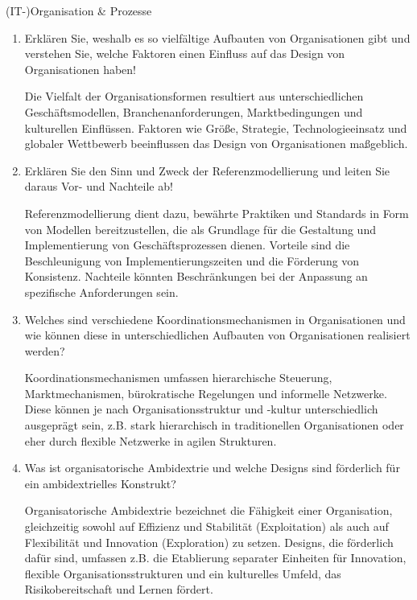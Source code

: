 \documentclass{article}
\begin{document}
\begin{exercise}{(IT-)Organisation \& Prozesse}
\begin{enumerate}
    \item Erklären Sie, weshalb es so vielfältige Aufbauten von Organisationen gibt und verstehen Sie, welche Faktoren einen Einfluss auf das Design von Organisationen haben!
          \begin{solution}
            Die Vielfalt der Organisationsformen resultiert aus unterschiedlichen Geschäftsmodellen, Branchenanforderungen, Marktbedingungen und kulturellen Einflüssen. Faktoren wie Größe, Strategie, Technologieeinsatz und globaler Wettbewerb beeinflussen das Design von Organisationen maßgeblich.
          \end{solution}

    \item Erklären Sie den Sinn und Zweck der Referenzmodellierung und leiten Sie daraus Vor- und Nachteile ab!
          \begin{solution}
            Referenzmodellierung dient dazu, bewährte Praktiken und Standards in Form von Modellen bereitzustellen, die als Grundlage für die Gestaltung und Implementierung von Geschäftsprozessen dienen. Vorteile sind die Beschleunigung von Implementierungszeiten und die Förderung von Konsistenz. Nachteile könnten Beschränkungen bei der Anpassung an spezifische Anforderungen sein.
          \end{solution}

    \item Welches sind verschiedene Koordinationsmechanismen in Organisationen und wie können diese in unterschiedlichen Aufbauten von Organisationen realisiert werden?
          \begin{solution}
            Koordinationsmechanismen umfassen hierarchische Steuerung, Marktmechanismen, bürokratische Regelungen und informelle Netzwerke. Diese können je nach Organisationsstruktur und -kultur unterschiedlich ausgeprägt sein, z.B. stark hierarchisch in traditionellen Organisationen oder eher durch flexible Netzwerke in agilen Strukturen.
          \end{solution}

    \item Was ist organisatorische Ambidextrie und welche Designs sind förderlich für ein ambidextrielles Konstrukt?
          \begin{solution}
            Organisatorische Ambidextrie bezeichnet die Fähigkeit einer Organisation, gleichzeitig sowohl auf Effizienz und Stabilität (Exploitation) als auch auf Flexibilität und Innovation (Exploration) zu setzen. Designs, die förderlich dafür sind, umfassen z.B. die Etablierung separater Einheiten für Innovation, flexible Organisationsstrukturen und ein kulturelles Umfeld, das Risikobereitschaft und Lernen fördert.
          \end{solution}


\end{enumerate}
\end{exercise}
\end{document}
